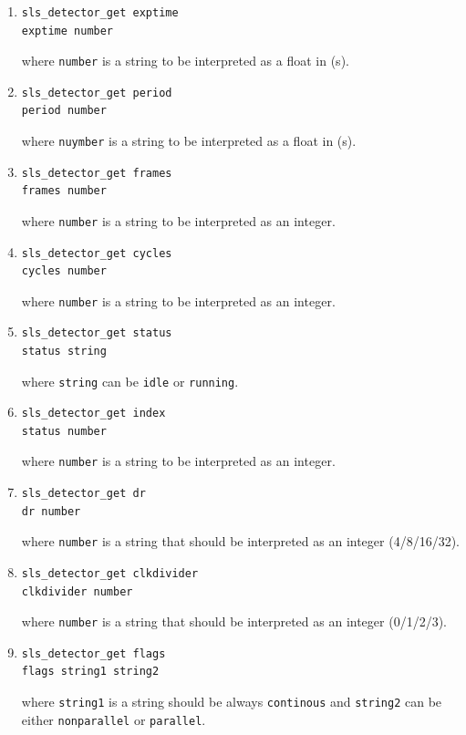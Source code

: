 \documentclass{article}
\begin{document}
\begin{enumerate}
\item \begin{verbatim}
sls_detector_get exptime
exptime number
\end{verbatim}
where {\tt{number}} is a string to be interpreted as a float in (s). 

\item \begin{verbatim}
sls_detector_get period
period number
\end{verbatim}
where {\tt{nuymber}} is a string to be interpreted as a float in (s). 

\item \begin{verbatim}
sls_detector_get frames
frames number 
\end{verbatim}
where {\tt{number}} is a string to be interpreted as an integer.

\item \begin{verbatim}
sls_detector_get cycles
cycles number 
\end{verbatim}
where {\tt{number}} is a string to be interpreted as an integer.

\item \begin{verbatim}
sls_detector_get status
status string 
\end{verbatim}
where {\tt{string}} can be {\tt{idle}} or {\tt{running}}.

\item \begin{verbatim}
sls_detector_get index
status number
\end{verbatim}
where {\tt{number}} is a string to be interpreted as an integer.

\item \begin{verbatim}
sls_detector_get dr
dr number
\end{verbatim}
where {\tt{number}} is a string that should be interpreted as an integer (4/8/16/32).

\item \begin{verbatim}
sls_detector_get clkdivider
clkdivider number
\end{verbatim}
where {\tt{number}} is a string that should be interpreted as an integer (0/1/2/3).

\item \begin{verbatim}
sls_detector_get flags
flags string1 string2 
\end{verbatim}
where {\tt{string1}} is a string should be always {\tt{continous}} and {\tt{string2}} can be either {\tt{nonparallel}} or {\tt{parallel}}.


\end{enumerate}
\end{document}
